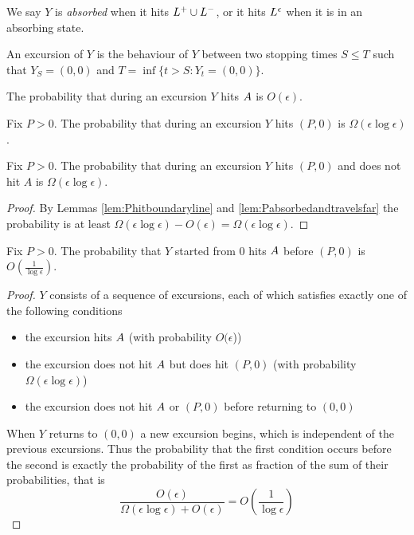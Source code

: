 {\begin{definition}
  We say $Y$ is \emph{absorbed} when it hits $L^+ \cup L^-$, or it hits $L^\epsilon$
  when it is in an absorbing state.
\end{definition}

\newcommand{\farpoint}{(P,0)}
\newcommand{\origin}{(0,0)}

\begin{definition}
  An excursion of $Y$ is the behaviour of $Y$ between two stopping times
  $S \le T$ such that $Y_S =
  \origin$ and $T = \inf\{ t > S : Y_t = \origin \}$.
\end{definition}

\newcommand{\Omegaeloge}{\Omega(\epsilon\log\epsilon)}

\begin{lemma}
  \label{lem:Phitboundaryline}
  The probability that during an excursion $Y$ hits $A$
  is $O(\epsilon)$.
\end{lemma}

\begin{lemma}
  \label{lem:Pabsorbedandtravelsfar}
  Fix $P > 0$.  The probability that during an excursion $Y$ hits $\farpoint$
  is $\Omegaeloge$.
\end{lemma}

\begin{lemma}
  Fix $P > 0$.  The probability that during an excursion $Y$ hits $\farpoint$
  and does not hit $A$ is $\Omegaeloge$.
\end{lemma}

\begin{proof}
  By Lemmas \ref{lem:Phitboundaryline} and
  \ref{lem:Pabsorbedandtravelsfar} the probability is at least
  $\Omegaeloge - O(\epsilon) = \Omegaeloge$.
\end{proof}

\begin{lemma}
  Fix $P > 0$.  The probability that $Y$ started from $0$ hits
  $A$ before $\farpoint$ is $O(\frac{1}{\log\epsilon})$.
\end{lemma}

\newcommand{\Oe}{O(\epsilon)}

\begin{proof}
  $Y$ consists of a sequence of excursions, each of which satisfies
  exactly one of the following conditions
  \begin{itemize}
  \item the excursion hits $A$ (with probability
    $O(\epsilon$))
  \item the excursion does not hit $A$ but does hit
    $\farpoint$ (with probability $\Omegaeloge$)
  \item the excursion does not hit $A$ or $\farpoint$ before
    returning to $\origin$
  \end{itemize}
  When $Y$ returns to $\origin$ a new excursion begins, which is independent of
  the previous excursions.  Thus the probability that the first
  condition occurs before the second is exactly the probability of the
  first as fraction of the sum of their probabilities, that is
  \[
  \frac{\Oe}{\Omegaeloge + \Oe} = O\left(\frac{1}{\log\epsilon}\right)
  \]
\end{proof}

}
